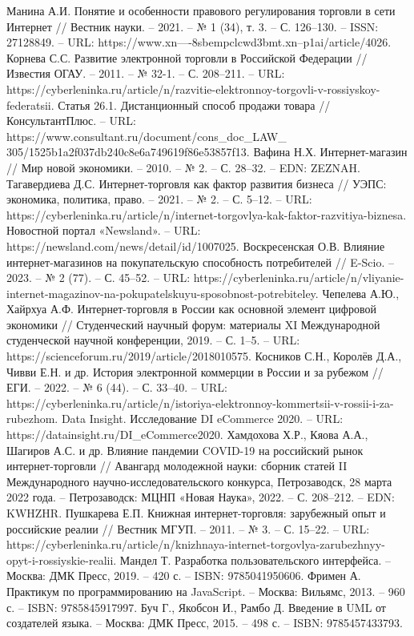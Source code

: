 
\begin{thebibliography}{9}

Манина А.И. Понятие и особенности правового регулирования торговли в сети Интернет // Вестник науки. – 2021. – № 1 (34), т. 3. – С. 126–130. – ISSN: 27128849. – URL: https://www.xn----8sbempclcwd3bmt.xn--p1ai/article/4026.
Корнева С.С. Развитие электронной торговли в Российской Федерации // Известия ОГАУ. – 2011. – № 32-1. – С. 208–211. – URL: https://cyberleninka.ru/article/n/razvitie-elektronnoy-torgovli-v-rossiyskoy-federatsii.
Статья 26.1. Дистанционный способ продажи товара // КонсультантПлюс. – URL: https://www.consultant.ru/document/cons\_doc\_LAW\_
305/1525b1a2f037db240c8e6a749619f86e53857f13.
Вафина Н.Х. Интернет-магазин // Мир новой экономики. – 2010. – № 2. – С. 28–32. – EDN: ZEZNAH.
Тагавердиева Д.С. Интернет-торговля как фактор развития бизнеса // УЭПС: экономика, политика, право. – 2021. – № 2. – С. 5–12. – URL: https://cyberleninka.ru/article/n/internet-torgovlya-kak-faktor-razvitiya-biznesa.
Новостной портал «Newsland». – URL: https://newsland.com/news/detail/id/1007025.
Воскресенская О.В. Влияние интернет-магазинов на покупательскую способность потребителей // E-Scio. – 2023. – № 2 (77). – С. 45–52. – URL: https://cyberleninka.ru/article/n/vliyanie-internet-magazinov-na-pokupatelskuyu-sposobnost-potrebiteley.
Чепелева А.Ю., Хайрхуа А.Ф. Интернет-торговля в России как основной элемент цифровой экономики // Студенческий научный форум: материалы XI Международной студенческой научной конференции, 2019. – С. 1–5. – URL: https://scienceforum.ru/2019/article/2018010575.
Косников С.Н., Королёв Д.А., Чивви Е.Н. и др. История электронной коммерции в России и за рубежом // ЕГИ. – 2022. – № 6 (44). – С. 33–40. – URL: https://cyberleninka.ru/article/n/istoriya-elektronnoy-kommertsii-v-rossii-i-za-rubezhom.
Data Insight. Исследование DI eCommerce 2020. – URL: https://datainsight.ru/DI\_eCommerce2020.
Хамдохова Х.Р., Кяова А.А., Шагиров А.С. и др. Влияние пандемии COVID-19 на российский рынок интернет-торговли // Авангард молодежной науки: сборник статей II Международного научно-исследовательского конкурса, Петрозаводск, 28 марта 2022 года. – Петрозаводск: МЦНП «Новая Наука», 2022. – С. 208–212. – EDN: KWHZHR.
Пушкарева Е.П. Книжная интернет-торговля: зарубежный опыт и российские реалии // Вестник МГУП. – 2011. – № 3. – С. 15–22. – URL: https://cyberleninka.ru/article/n/knizhnaya-internet-torgovlya-zarubezhnyy-opyt-i-rossiyskie-realii.
Мандел Т. Разработка пользовательского интерфейса. – Москва: ДМК Пресс, 2019. – 420 с. – ISBN: 9785041950606.
Фримен А. Практикум по программированию на JavaScript. – Москва: Вильямс, 2013. – 960 с. – ISBN: 9785845917997.
Буч Г., Якобсон И., Рамбо Д. Введение в UML от создателей языка. – Москва: ДМК Пресс, 2015. – 498 с. – ISBN: 9785457433793.
\end{thebibliography}
